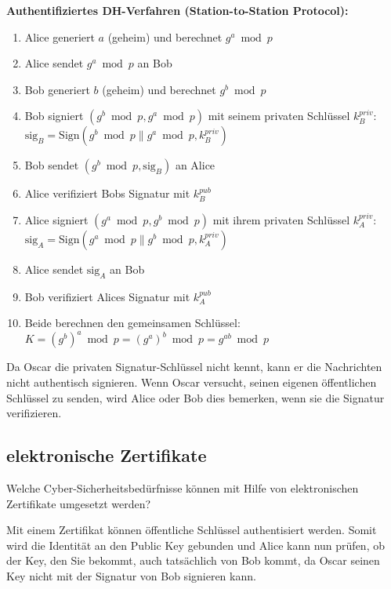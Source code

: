 \documentclass[a4paper]{article}
\begin{document}
\begin{enumerate}
    \textbf{Authentifiziertes DH-Verfahren (Station-to-Station Protocol):}
    \begin{enumerate}
        \item Alice generiert $a$ (geheim) und berechnet $g^a \bmod p$
        \item Alice sendet $g^a \bmod p$ an Bob
        \item Bob generiert $b$ (geheim) und berechnet $g^b \bmod p$
        \item Bob signiert $(g^b \bmod p, g^a \bmod p)$ mit seinem privaten Schlüssel $k_B^{priv}$: $\text{sig}_B = \text{Sign}(g^b \bmod p \| g^a \bmod p, k_B^{priv})$
        \item Bob sendet $(g^b \bmod p, \text{sig}_B)$ an Alice
        \item Alice verifiziert Bobs Signatur mit $k_B^{pub}$
        \item Alice signiert $(g^a \bmod p, g^b \bmod p)$ mit ihrem privaten Schlüssel $k_A^{priv}$: $\text{sig}_A = \text{Sign}(g^a \bmod p \| g^b \bmod p, k_A^{priv})$
        \item Alice sendet $\text{sig}_A$ an Bob
        \item Bob verifiziert Alices Signatur mit $k_A^{pub}$
        \item Beide berechnen den gemeinsamen Schlüssel: $K = (g^b)^a \bmod p = (g^a)^b \bmod p = g^{ab} \bmod p$
    \end{enumerate}
    
    Da Oscar die privaten Signatur-Schlüssel nicht kennt, kann er die Nachrichten nicht authentisch signieren. Wenn Oscar versucht, seinen eigenen öffentlichen Schlüssel zu senden, wird Alice oder Bob dies bemerken, wenn sie die Signatur verifizieren.
\end{enumerate}

\subsection{elektronische Zertifikate}

Welche Cyber-Sicherheitsbedürfnisse können mit Hilfe von elektronischen Zertifikate umgesetzt werden?

Mit einem Zertifikat können öffentliche Schlüssel authentisiert werden. Somit wird die Identität an den Public Key gebunden und Alice kann nun prüfen, ob der Key, den Sie bekommt, auch tatsächlich von Bob kommt, da Oscar seinen Key nicht mit der Signatur von Bob signieren kann. 
\end{document}
